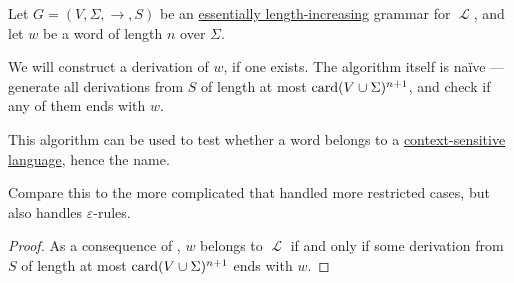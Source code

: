 \begin{algorithm}\label{alg:length_increasing_grammar}
  Let \( G = (V, \Sigma, \to, S) \) be an \hyperref[def:length_increasing_grammar]{essentially length-increasing} grammar for \( \mscrL \), and let \( w \) be a word of length \( n \) over \( \Sigma \).

  We will construct a derivation of \( w \), if one exists. The algorithm itself is na\"ive --- generate all derivations from \( S \) of length at most \( \operatorname{card}(V \cup \Sigma)^{n+1} \), and check if any of them ends with \( w \).
\end{algorithm}
\begin{comments}
  \item This algorithm can be used to test whether a word belongs to a \hyperref[def:chomsky_hierarchy/context_sensitive]{context-sensitive language}, hence the name.

  \item Compare this to the more complicated  that handled more restricted cases, but also handles \( \varepsilon \)-rules.
\end{comments}
\begin{proof}
  As a consequence of , \( w \) belongs to \( \mscrL \) if and only if some derivation from \( S \) of length at most \( \operatorname{card}(V \cup \Sigma)^{n+1} \) ends with \( w \).
\end{proof}


